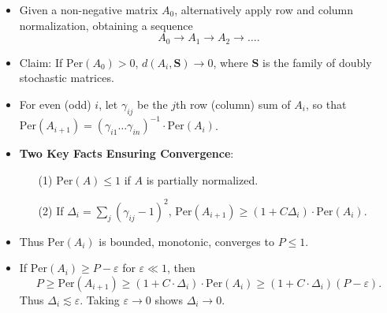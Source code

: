 \documentclass[usenames,dvipsnames,12pt]{beamer}
\begin{document}
\begin{frame}
    \begin{itemize}
        \item Given a non-negative matrix $A_0$, alternatively apply row and column normalization, obtaining a sequence
        \[ A_0 \to A_1 \to A_2 \to \dots. \]

        \pause
        \item Claim: If $\text{Per}(A_0) > 0$, $d(A_i, \mathbf{S}) \to 0$, where $\mathbf{S}$ is the family of doubly stochastic matrices.

        \pause
        \item For even (odd) $i$, let $\gamma_{ij}$ be the $j$th row (column) sum of $A_i$, so that $\text{Per}(A_{i+1}) = (\gamma_{i1} \dots \gamma_{in})^{-1} \cdot \text{Per}(A_i)$.

        \pause
        \item {\bf Two Key Facts Ensuring Convergence}:
        \begin{itemize}
            \pause
            \item[(1)] $\text{Per}(A) \leq 1$ if $A$ is partially normalized.
            \pause
            \item[(2)] If $\Delta_i = \sum_j (\gamma_{ij} - 1)^2$, $\text{Per}(A_{i+1}) \geq (1 + C \Delta_i) \cdot \text{Per}(A_i)$.
        \end{itemize}

        \pause
        \item Thus $\text{Per}(A_i)$ is bounded, monotonic, converges to $P \leq 1$.

        \pause
        \item If $\text{Per}(A_i) \geq P - \varepsilon$ for $\varepsilon \ll 1$, then
        \[ P \geq \text{Per}(A_{i+1}) \geq (1 + C \cdot \Delta_i) \cdot \text{Per}(A_i) \geq (1 + C \cdot \Delta_i)(P - \varepsilon). \]
        Thus $\Delta_i \lesssim \varepsilon$. Taking $\varepsilon \to 0$ shows $\Delta_i \to 0$.
    \end{itemize}
\end{frame}
\end{document}
